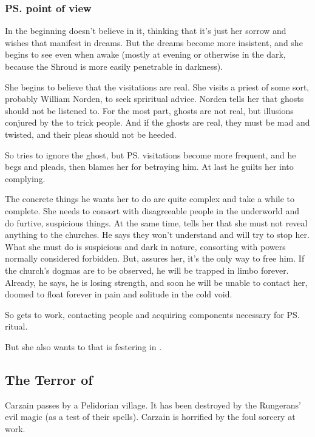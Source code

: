 \subsubsection{\ps{\Tiroco} point of view}
In the beginning \Tiroco{} doesn't believe in it, thinking that it's just her sorrow and wishes that manifest in dreams. But the dreams become more insistent, and she begins to see \Icor{} even when awake (mostly at evening or otherwise in the dark, because the Shroud is more easily penetrable in darkness). 

She begins to believe that the visitations are real. She visits a priest of some sort, probably William Norden, to seek spriritual advice. Norden tells her that ghosts should not be listened to. For the most part, ghosts are not real, but illusions conjured by the \Qliphoth{} to trick people. And if the ghosts are real, they must be mad and twisted, and their pleas should not be heeded.

So \Tiroco{} tries to ignore the ghost, but \ps{\Icor} visitations become more frequent, and he begs and pleads, then blames her for betraying him. At last he guilts her into complying. 

The concrete things he wants her to do are quite complex and take a while to complete. She needs to consort with disagreeable people in the \Malcurian underworld and do furtive, suspicious things. At the same time, \Icor{} tells her that she must not reveal anything to the churches. He says they won't understand and will try to stop her. What she must do is suspicious and dark in nature, consorting with powers normally considered forbidden. But, \Icor{} assures her, it's the only way to free him. If the church's dogmas are to be observed, he will be trapped in limbo forever. Already, he says, he is losing strength, and soon he will be unable to contact her, doomed to float forever in pain and solitude in the cold void. 

So \Tiroco{} gets to work, contacting people and acquiring components necessary for \ps{\Icor}  ritual. 

But she also wants to  that is festering in \Malcur. 









\subsection{The Terror of \EreshKal}
Carzain passes by a Pelidorian village. 
It has been destroyed by the Rungerans' evil magic (as a test of their spells). 
Carzain is horrified by the foul sorcery at work. 








